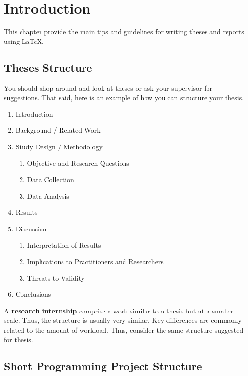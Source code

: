 \chapter{Introduction}
\label{ch:introduction}

This chapter provide the main tips and guidelines for writing theses and reports using \LaTeX.

\section{Theses Structure}
\label{sec:c1:thesesguidelines}

You should shop around and look at theses or ask your supervisor for suggestions.
That said, here is an example of how you can structure your thesis.

\begin{enumerate}
    \item Introduction
    \item Background / Related Work
    \item Study Design / Methodology
    \begin{enumerate}
        \item Objective and Research Questions
        \item Data Collection
        \item Data Analysis
    \end{enumerate}
    \item Results
    \item Discussion
    \begin{enumerate}
        \item Interpretation of Results
        \item Implications to Practitioners and Researchers
        \item Threats to Validity
    \end{enumerate}
    \item Conclusions
\end{enumerate}

A \textbf{research internship} comprise a work similar to a thesis but at a smaller scale. Thus, the structure is usually very similar. Key differences are commonly related to the amount of workload. Thus, consider the same structure suggested for thesis.

\section{Short Programming Project Structure}
\label{sec:c1:sppguidelines}


